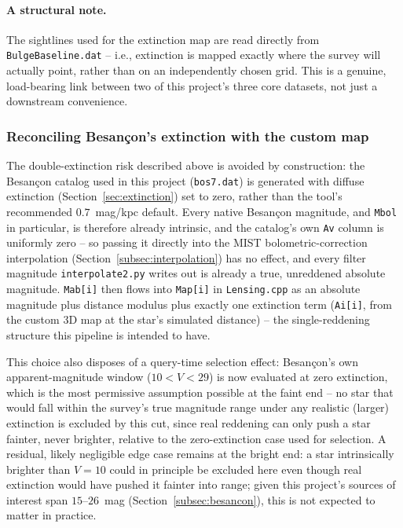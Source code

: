 \documentclass[english,10pt,a4paper]{article}
\begin{document}
	\paragraph{A structural note.} The sightlines used for the extinction map are read directly from \texttt{BulgeBaseline.dat} -- i.e., extinction is mapped exactly where the survey will actually point, rather than on an independently chosen grid. This is a genuine, load-bearing link between two of this project's three core datasets, not just a downstream convenience.
	
	\subsubsection{Reconciling Besan\c{c}on's extinction with the custom map}
	\label{sec:extinction-fix}
	
	The double-extinction risk described above is avoided by construction: the Besan\c{c}on catalog used in this project (\texttt{bos7.dat}) is generated with diffuse extinction (Section~\ref{sec:extinction}) set to zero, rather than the tool's recommended $0.7$~mag/kpc default. Every native Besan\c{c}on magnitude, and \texttt{Mbol} in particular, is therefore already intrinsic, and the catalog's own \texttt{Av} column is uniformly zero -- so passing it directly into the MIST bolometric-correction interpolation (Section~\ref{subsec:interpolation}) has no effect, and every filter magnitude \texttt{interpolate2.py} writes out is already a true, unreddened absolute magnitude. \texttt{Mab[i]} then flows into \texttt{Map[i]} in \texttt{Lensing.cpp} as an absolute magnitude plus distance modulus plus exactly one extinction term (\texttt{Ai[i]}, from the custom 3D map at the star's simulated distance) -- the single-reddening structure this pipeline is intended to have.
	
	This choice also disposes of a query-time selection effect: Besan\c{c}on's own apparent-magnitude window ($10<V<29$) is now evaluated at zero extinction, which is the most permissive assumption possible at the faint end -- no star that would fall within the survey's true magnitude range under any realistic (larger) extinction is excluded by this cut, since real reddening can only push a star fainter, never brighter, relative to the zero-extinction case used for selection. A residual, likely negligible edge case remains at the bright end: a star intrinsically brighter than $V=10$ could in principle be excluded here even though real extinction would have pushed it fainter into range; given this project's sources of interest span $15$--$26$~mag (Section~\ref{subsec:besancon}), this is not expected to matter in practice.
	
\end{document}
